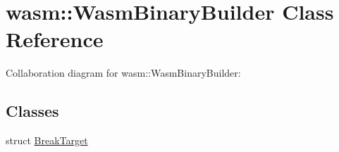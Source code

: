 \hypertarget{classwasm_1_1_wasm_binary_builder}{}\section{wasm\+:\+:Wasm\+Binary\+Builder Class Reference}
\label{classwasm_1_1_wasm_binary_builder}


Collaboration diagram for wasm\+:\+:Wasm\+Binary\+Builder\+:
\subsection*{Classes}
\begin{DoxyCompactItemize}
\item 
struct \mbox{\hyperlink{structwasm_1_1_wasm_binary_builder_1_1_break_target}{Break\+Target}}
\end{DoxyCompactItemize}
